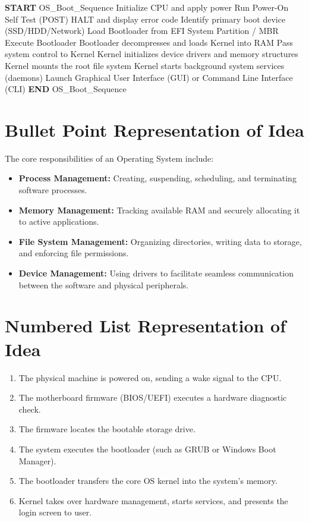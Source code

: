 \documentclass[11pt, a4paper]{article}
\begin{document}
\begin{algorithm}[H]
\caption{OS Boot Sequence}
\begin{algorithmic}[1]
\State \textbf{START} OS\_Boot\_Sequence
\State Initialize CPU and apply power
\State Run Power-On Self Test (POST)
    \State HALT and display error code
\Else
    \State Identify primary boot device (SSD/HDD/Network)
    \State Load Bootloader from EFI System Partition / MBR
    \State Execute Bootloader
    \State Bootloader decompresses and loads Kernel into RAM
    \State Pass system control to Kernel
    \State Kernel initializes device drivers and memory structures
    \State Kernel mounts the root file system
    \State Kernel starts background system services (daemons)
    \State Launch Graphical User Interface (GUI) or Command Line Interface (CLI)
\EndIf
\State \textbf{END} OS\_Boot\_Sequence
\end{algorithmic}
\end{algorithm}

\section*{Bullet Point Representation of Idea}
The core responsibilities of an Operating System include:
\begin{itemize}
    \item \textbf{Process Management:} Creating, suspending, scheduling, and terminating software processes.
    \item \textbf{Memory Management:} Tracking available RAM and securely allocating it to active applications.
    \item \textbf{File System Management:} Organizing directories, writing data to storage, and enforcing file permissions.
    \item \textbf{Device Management:} Using drivers to facilitate seamless communication between the software and physical peripherals.
\end{itemize}

\section*{Numbered List Representation of Idea}
\begin{enumerate}
    \item The physical machine is powered on, sending a wake signal to the CPU.
    \item The motherboard firmware (BIOS/UEFI) executes a hardware diagnostic check.
    \item The firmware locates the bootable storage drive.
    \item The system executes the bootloader (such as GRUB or Windows Boot Manager).
    \item The bootloader transfers the core OS kernel into the system's memory.
    \item Kernel takes over hardware management, starts services, and presents the login screen to user.
\end{enumerate}
\end{document}
